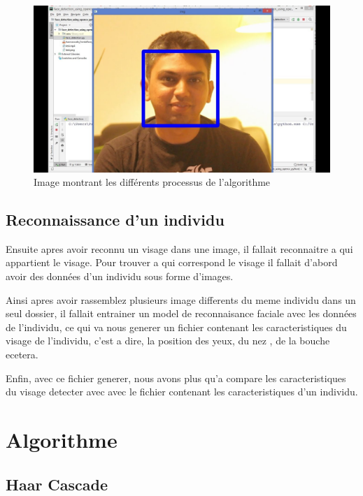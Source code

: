 \documentclass{article}
\begin{document}
\begin{figure}[h]
    \centering
    \includegraphics[width=\textwidth]{image/face_detection.jpg}
    \caption{Image montrant les différents processus de l'algorithme}
    \label{fig:mon_image}
\end{figure}

\subsection{Reconnaissance d'un individu}

Ensuite apres avoir reconnu un visage dans une image, il fallait reconnaitre a qui appartient le visage.
Pour trouver a qui correspond le visage il fallait d'abord avoir des données d'un individu sous forme d'images.

Ainsi apres avoir rassemblez plusieurs image differents du meme individu dans un seul dossier, 
il fallait entrainer un model de reconnaisance faciale avec les données de l'individu, ce qui va nous 
generer un fichier contenant les caracteristiques du visage de l'individu, c'est a dire, la position des yeux, du nez
, de la bouche ecetera.

Enfin, avec ce fichier generer, nous avons plus qu'a compare les caracteristiques du visage detecter avec  avec le fichier contenant les caracteristiques d'un individu.


\newpage
\section{Algorithme}

\subsection{Haar Cascade}
\end{document}
